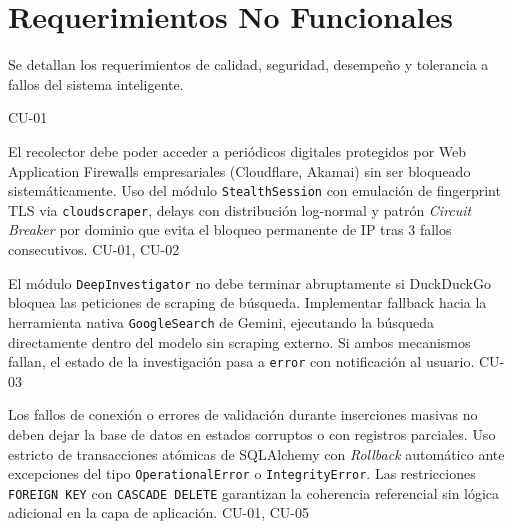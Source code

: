 
\section{Requerimientos No Funcionales}

Se detallan los requerimientos de calidad, seguridad, desempeño y tolerancia a fallos del
sistema inteligente.

\begin{NFRequerimientos}

            {CU-01}

            {El recolector debe poder acceder a periódicos digitales protegidos por
            Web Application Firewalls empresariales (Cloudflare, Akamai) sin ser bloqueado
            sistemáticamente.}
            {Uso del módulo \texttt{StealthSession} con emulación de fingerprint TLS via
            \texttt{cloudscraper}, delays con distribución log-normal y patrón \textit{Circuit Breaker}
            por dominio que evita el bloqueo permanente de IP tras 3 fallos consecutivos.}
            {CU-01, CU-02}

            {El módulo \texttt{DeepInvestigator} no debe terminar abruptamente si DuckDuckGo
            bloquea las peticiones de scraping de búsqueda.}
            {Implementar fallback hacia la herramienta nativa \texttt{GoogleSearch} de Gemini,
            ejecutando la búsqueda directamente dentro del modelo sin scraping externo. Si
            ambos mecanismos fallan, el estado de la investigación pasa a \texttt{error}
            con notificación al usuario.}
            {CU-03}

            {Los fallos de conexión o errores de validación durante inserciones masivas
            no deben dejar la base de datos en estados corruptos o con registros parciales.}
            {Uso estricto de transacciones atómicas de SQLAlchemy con \textit{Rollback}
            automático ante excepciones del tipo \texttt{OperationalError} o
            \texttt{IntegrityError}. Las restricciones \texttt{FOREIGN KEY} con
            \texttt{CASCADE DELETE} garantizan la coherencia referencial sin lógica
            adicional en la capa de aplicación.}
            {CU-01, CU-05}


\end{NFRequerimientos}
